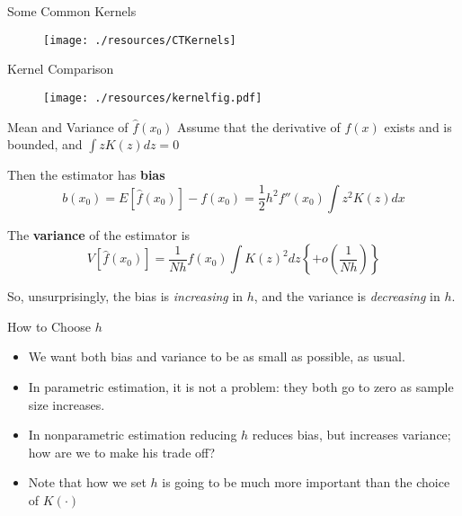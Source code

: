 \begin{frame}{Some Common Kernels}
  \begin{figure}[htbp]
  \begin{center}
  \texttt{[image: ./resources/CTKernels]}
  \label{fig:kernels}
  \end{center}
  \end{figure}
\end{frame}
  
\begin{frame}{Kernel Comparison}
  \begin{figure}[htbp]
  \begin{center}
  \texttt{[image: ./resources/kernelfig.pdf]}
  \label{kernelfig}
  \end{center}
  \end{figure}
\end{frame}

\begin{frame}{Mean and Variance of $\hat{f}(x_0)$}
  Assume that the derivative of $f(x)$ exists and is bounded, and  $\int z K(z) d z = 0$

  Then the estimator has \textbf{bias}
  \[
    b(x_0) = E \left[\hat{f}(x_0) \right] - f(x_0) = \frac{1}{2} h^2 f''(x_0)\int z^2K(z)dx
  \]

  The \textbf{variance} of the estimator is
  \[
    V \left[\hat{f}(x_0) \right] = \frac{1}{Nh} f(x_0) \int K(z)^2dz \left\{ + o(\frac{1}{Nh}) \right\}
  \]

  So, unsurprisingly, the bias is \textit{increasing} in $h$, and the variance is \textit{decreasing} in $h$.
\end{frame}
 
\begin{frame}{How to Choose $h$}
  \begin{itemize}
    \item We want both bias and variance to be as small as possible, as usual. 
    \item In parametric estimation, it is not a problem: they both go to zero as sample size increases.
    \item In nonparametric estimation reducing $h$ reduces bias, but increases variance; how are we to make his trade off?
    \item Note that how we set $h$ is going to be much more important than the choice of $K(\cdot)$
  \end{itemize}  
\end{frame}

